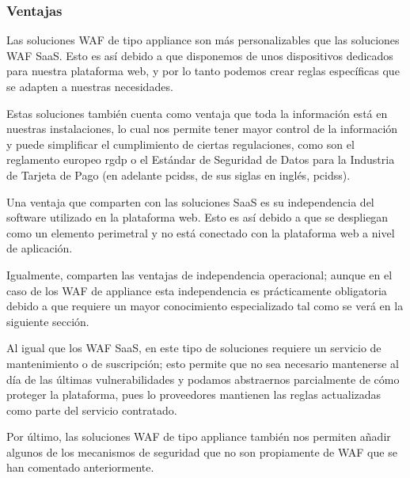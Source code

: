 \subsubsection{Ventajas}
\par Las soluciones WAF de tipo appliance son más personalizables que las soluciones WAF SaaS. Esto es así debido a que disponemos de unos
dispositivos dedicados para nuestra plataforma web, y por lo tanto podemos crear reglas específicas que se adapten a nuestras necesidades.
\par Estas soluciones también cuenta como ventaja que toda la información está en nuestras instalaciones, lo cual nos permite tener mayor
control de la información y puede simplificar el cumplimiento de ciertas regulaciones, como son el reglamento europeo \acrshort{rgdp} o el
Estándar de Seguridad de Datos para la Industria de Tarjeta de Pago (en adelante \acrshort{pcidss}, de sus siglas en inglés, \acrlong{pcidss}).
\par Una ventaja que comparten con las soluciones SaaS es su independencia del software utilizado en la plataforma web. Esto es así debido a
que se despliegan como un elemento perimetral y no está conectado con la plataforma web a nivel de aplicación.
\par Igualmente, comparten las ventajas de independencia operacional; aunque en el caso de los WAF de appliance esta independencia es
prácticamente obligatoria debido a que requiere un mayor conocimiento especializado tal como se verá en la siguiente sección.
\par Al igual que los WAF SaaS, en este tipo de soluciones requiere un servicio de mantenimiento o de suscripción; esto permite que no sea
necesario mantenerse al día de las últimas vulnerabilidades y podamos abstraernos parcialmente de cómo proteger la plataforma, pues lo
proveedores mantienen las reglas actualizadas como parte del servicio contratado.
\par Por último, las soluciones WAF de tipo appliance también nos permiten añadir algunos de los mecanismos de seguridad que no son propiamente
de WAF que se han comentado anteriormente.

